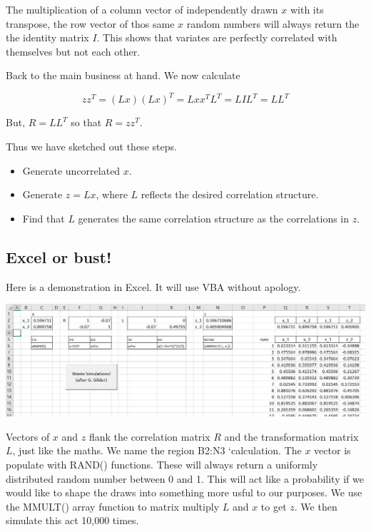 \documentclass[
]{book}
\begin{document}
The multiplication of a column vector of independently drawn \(x\) with its transpose, the row vector of thos same \(x\) random numbers will always return the the identity matrix \(I\). This shows that variates are perfectly correlated with themselves but not each other.

Back to the main business at hand. We now calculate

\[
zz^T = (Lx)(Lx)^T = Lxx^TL^T = LIL^T = LL^T
\]

But, \(R = LL^T\) so that \(R = zz^T\).

Thus we have sketched out these steps.

\begin{itemize}
\item
  Generate uncorrelated \(x\).
\item
  Generate \(z = Lx\), where \(L\) reflects the desired correlation structure.
\item
  Find that \(L\) generates the same correlation structure as the correlations in \(z\).
\end{itemize}

\hypertarget{excel-or-bust}{%
\subsection{Excel or bust!}\label{excel-or-bust}}

Here is a demonstration in Excel. It will use VBA without apology.

\includegraphics{images/05/cholesky-demo-calculation.jpg}

Vectors of \(x\) and \(z\) flank the correlation matrix \(R\) and the transformation matrix \(L\), just like the maths. We name the region B2:N3 `calculation. The \(x\) vector is populate with RAND() functions. These will always return a uniformly distributed random number between 0 and 1. This will act like a probability if we would like to shape the draws into something more usful to our purposes. We use the MMULT() array function to matrix multiply \(L\) and \(x\) to get \(z\). We then simulate this act 10,000 times.
\end{document}
